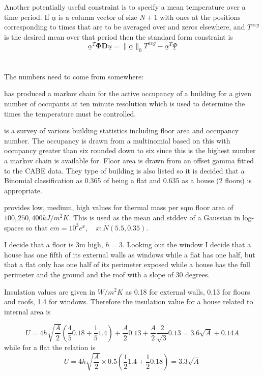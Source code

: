 \documentclass[11pt]{article}
\begin{document}
Another potentially useful constraint is to specify a mean temperature over a time period. If $\underline{\alpha}$ is a column vector of size $N+1$ with ones at the positions corresponding to times that are to be averaged over and zeros elsewhere, and $T^{avg}$ is the desired mean over that period then the standard form constraint is
\begin{equation}
\underline{\alpha}^{T} \mathbf{\Phi} \mathbf{D} \underline{u} = \|\underline{\alpha}\|_{0} T^{avg} -\underline{\alpha}^{T} \underline{\Psi}
\end{equation}

\section{}
The numbers need to come from somewhere:

\cite{richardson2008high} has produced a markov chain for the active occupancy of a building for a given number of occupants at ten minute resolution which is used to determine the times the temperature must be controlled.

\cite{CABE} is a survey of various building statistics including floor area and occupancy number. The occupancy is drawn from a multinomial based on this  with occupancy greater than six rounded down to six since this is the highest number a markov chain is available for. Floor area is drawn from an offset gamma fitted to the CABE data. They type of building is also listed so it is decided that a Binomial classification as 0.365 of being a flat and 0.635 as a house (2 floors) is appropriate.

\cite{SAP} provides low, medium, high values for thermal mass per sqm floor area of $100,250,400 kJ/m^{2}K$. This is used as the mean and stddev of a Gaussian in log-spaces so that $cm=10^{3}e^{x},\quad x:N(5.5,0.35)$.

I decide that a floor is 3m high, $h=3$. Looking out the window I decide that a house has one fifth of its external walls as windows  while a flat has one half, but that a flat only has one half of its perimeter exposed while a house has the full perimeter and the ground and the roof with a slope of 30 degrees.

Insulation values are given in $W/m^{2}K$ as 0.18 for external walls, 0.13 for floors and roofs, 1.4 for windows. Therefore the insulation value for a house related to internal area is

\begin{equation}
U=4h \sqrt{\frac{A}{2}}(\frac{4}{5}0.18 + \frac{1}{5}1.4) + \frac{A}{2}0.13+\frac{A}{2}\frac{2}{\sqrt{3}}0.13 = 3.6\sqrt{A}+0.14A
\end{equation}
while for a flat the relation is
\begin{equation}
U=4h \sqrt{\frac{A}{2}}\times 0.5(\frac{1}{2}1.4+\frac{1}{2}0.18)=3.3\sqrt{A}
\end{equation}
\end{document}
